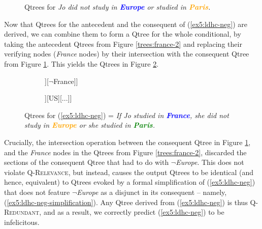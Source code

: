 \begin{figure}[H]
	\centering
	\caption{Qtrees for \textit{Jo did not study in \textbf{\textcolor{blue}{Europe}} or studied in \textbf{\textcolor{orange}{Paris}}.}}\label{tree:not-europe-or-paris}
\end{figure}

Now that Qtrees for the antecedent and the consequent of (\ref{ex5:ldhc-neg}) are derived, we can combine them to form a Qtree for the whole conditional, by taking the antecedent Qtrees from Figure \ref{trees:france-2} and replacing their verifying nodes (\textit{France} nodes) by their intersection with the consequent Qtree from Figure \ref{tree:not-europe-or-paris}. This yields the Qtrees in Figure \ref{trees:if-france-then-not-europe-or-paris}. 

\begin{figure}[H]
	\centering
	\begin{subfigure}[b]{.3\linewidth}
		\centering
		\begin{forest}
			[CS[{France}[\fbox{Paris}][Nice][...]][$\neg$France]]
		\end{forest}
		\caption{}
	\end{subfigure}
	\qquad
	\begin{subfigure}[b]{.3\linewidth}
		\centering
		\begin{forest}
			[CS[{France}[\fbox{Paris}][Nice][...]][US][...]]
		\end{forest}
		\caption{}
	\end{subfigure}
	\caption{Qtrees for (\ref{ex5:ldhc-neg}) = \textit{If Jo studied in \textcolor{blue}{\textbf{France}}, she did not study in \textcolor{orange}{\textbf{Europe}} or she studied in \textcolor{green}{\textbf{Paris}}.}} \label{trees:if-france-then-not-europe-or-paris}
\end{figure}

Crucially, the intersection operation between the consequent Qtree in Figure \ref{tree:not-europe-or-paris}, and the \textit{France} nodes in the Qtrees from Figure \ref{trees:france-2}, discarded the sections of the consequent Qtree that had to do with $\neg$\textit{Europe}. This does not violate \textsc{Q-Relevance}, but instead, causes the output Qtrees to be identical (and hence, equivalent) to Qtrees evoked by a formal simplification of (\ref{ex5:ldhc-neg}) that does not feature $\neg$\textit{Europe} as a disjunct in its consequent -- namely, (\ref{ex5:ldhc-neg-simplification}). Any Qtree derived from (\ref{ex5:ldhc-neg}) is thus \textsc{Q-Redundant}, and as a result, we correctly predict (\ref{ex5:ldhc-neg}) to be infelicitous.\\

